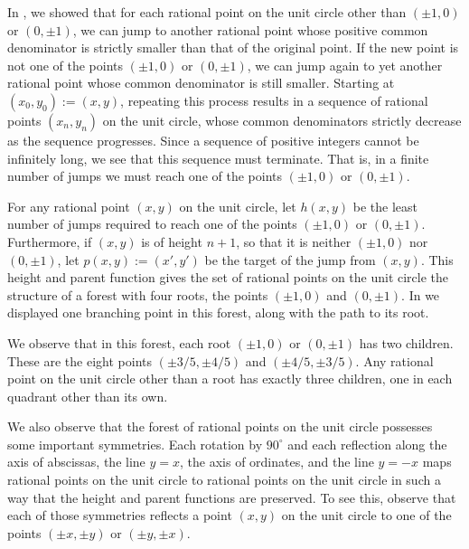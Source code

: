 \begin{example}
  In , we showed that for each rational point on the unit circle other than $(\pm 1,0)$ or $(0,\pm 1)$, we can jump to another rational point whose positive common denominator is strictly smaller than that of the original point. If the new point is not one of the points $(\pm 1,0)$ or $(0,\pm 1)$, we can jump again to yet another rational point whose common denominator is still smaller. Starting at $(x_0,y_0):=(x,y)$, repeating this process results in a sequence of rational points $(x_n,y_n)$ on the unit circle, whose common denominators strictly decrease as the sequence progresses. Since a sequence of positive integers cannot be infinitely long, we see that this sequence must terminate. That is, in a finite number of jumps we must reach one of the points $(\pm 1,0)$ or $(0,\pm 1)$.

  For any rational point $(x,y)$ on the unit circle, let $h(x,y)$ be the least number of jumps required to reach one of the points $(\pm 1,0)$ or $(0,\pm 1)$. Furthermore, if $(x,y)$ is of height $n+1$, so that it is neither $(\pm 1,0)$ nor $(0,\pm 1)$, let $p(x,y):=(x',y')$ be the target of the jump from $(x,y)$. This height and parent function gives the set of rational points on the unit circle the structure of a forest with four roots, the points $(\pm 1,0)$ and $(0,\pm 1)$. In  we displayed one branching point in this forest, along with the path to its root.

  We observe that in this forest, each root $(\pm 1,0)$ or $(0,\pm 1)$ has two children. These are the eight points $(\pm 3/5,\pm 4/5)$ and $(\pm 4/5,\pm 3/5)$. Any rational point on the unit circle other than a root has exactly three children, one in each quadrant other than its own.

  We also observe that the forest of rational points on the unit circle possesses some important symmetries. Each rotation by $90^\circ$ and each reflection along the axis of abscissas, the line $y=x$, the axis of ordinates, and the line $y=-x$ maps rational points on the unit circle to rational points on the unit circle in such a way that the height and parent functions are preserved. To see this, observe that each of those symmetries reflects a point $(x,y)$ on the unit circle to one of the points $(\pm x,\pm y)$ or $(\pm y,\pm x)$.
\end{example}

